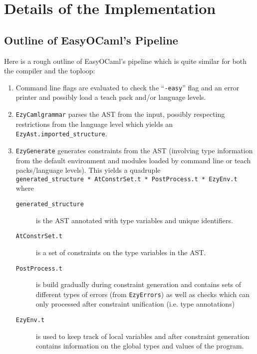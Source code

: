 
\section{Details of the Implementation}
\label{impldets}

\subsection{Outline of EasyOCaml's Pipeline}
\label{hd005001}
Here is a rough outline of EasyOCaml's pipeline which is quite similar 
for both the compiler and the toploop:

\begin{enumerate}
    \item \label{steps} Command line flags are evaluated to check 
        the ``\texttt{-easy}'' flag and an error printer and possibly 
        load a teach pack and/or language levels.
    \item \texttt{EzyCamlgrammar} parses the AST from the input, 
        possibly respecting restrictions from the language level which 
        yields an \texttt{EzyAst.imported\_structure}.
    \item \texttt{EzyGenerate} generates constraints from the AST 
        (involving type information from the default environment and 
        modules loaded by command line or teach packs/language levels).  
        This yields a quadruple 
        \texttt{generated\_structure~*~AtConstrSet.t~*~PostProcess.t~*~EzyEnv.t} 
        where
        \begin{description}
            \item[\texttt{generated\_structure}] is the AST 
                annotated with type variables and unique identifiers.
            \item[\texttt{AtConstrSet.t}] is a set of constraints on 
                the type variables in the AST.
            \item[\texttt{PostProcess.t}] is build gradually during 
                constraint generation and contains sets of different 
                types of errors (from \texttt{EzyErrors}) as well as 
                checks which can only processed after constraint 
                unification (i.e. type annotations)
            \item[\texttt{EzyEnv.t}] is used to keep track of local 
                variables and after constraint generation contains 
                information on the global types and values of the 
                program.
        \end{description}

\end{enumerate}
